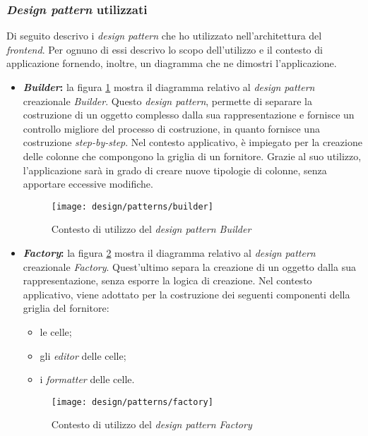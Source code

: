 \subsubsection{\emph{Design pattern} utilizzati}
Di seguito descrivo i \emph{design pattern} che ho utilizzato nell'architettura del \emph{\gls{frontend}}. 
Per ognuno di essi descrivo lo scopo dell'utilizzo e il contesto di applicazione fornendo, inoltre, un diagramma che ne dimostri l'applicazione.
\begin{itemize}
  \item \textbf{\emph{Builder}:}
  la figura \ref{fig:builder-pattern} mostra il diagramma relativo al \emph{design pattern} creazionale \emph{Builder}. Questo \emph{design pattern}, permette di separare la costruzione di un oggetto complesso dalla
  sua rappresentazione e fornisce un controllo migliore del processo di costruzione, in quanto fornisce una costruzione \emph{step-by-step}. Nel contesto applicativo, è impiegato per la creazione delle colonne
  che compongono la griglia di un fornitore. Grazie al suo utilizzo, l'applicazione sarà in grado di creare nuove tipologie di colonne, senza apportare eccessive modifiche.

  \begin{figure}[!ht]
    \begin{center}
      \texttt{[image: design/patterns/builder]}
      \caption{Contesto di utilizzo del \emph{design pattern Builder}}
      \label{fig:builder-pattern}
    \end{center}
  \end{figure}
  \newpage
  \item \textbf{\emph{Factory}:}
  la figura \ref{fig:factory-pattern} mostra il diagramma relativo al \emph{design pattern} creazionale \emph{Factory}. Quest'ultimo separa la creazione di un oggetto dalla sua rappresentazione, senza esporre la logica 
  di creazione. Nel contesto applicativo, viene adottato per la costruzione dei seguenti componenti della griglia del fornitore: 
  \begin{itemize}
    \item le celle;
    \item gli \emph{editor} delle celle;
    \item i \emph{formatter} delle celle.
  \end{itemize}

  \begin{figure}[!ht]
    \begin{center}
      \texttt{[image: design/patterns/factory]}
      \caption{Contesto di utilizzo del \emph{design pattern Factory}}
      \label{fig:factory-pattern}
    \end{center}
  \end{figure}
\end{itemize}

